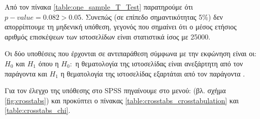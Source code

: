 \documentclass{assignment}
\begin{document}
\begin{Assignment}[Μέρος Β]
Από τον πίνακα \ref{table:one_sample_T_Test} παρατηρούμε ότι $p-value= 0.082 > 0.05$. Συνεπώς (σε επίπεδο σημαντικότητας 5\%) δεν απορρίπτουμε τη μηδενική υπόθεση, γεγονός που σημαίνει ότι ο μέσος ετήσιος αριθμός επισκέψεων των ιστοσελίδων είναι στατιστικά ίσος με 25000.



Οι δύο υποθέσεις που έρχονται σε αντιπαράθεση σύμφωνα με την εκφώνηση είναι οι: $H_0$ και $H_1$ όπου η $Η_0:$ η θεματολογία της ιστοσελίδας είναι ανεξάρτητη από τον παράγοντα  και $H_1$ η θεματολογία της ιστοσελίδας εξαρτάται από τον παράγοντα .

Για τον έλεγχο της υπόθεσης στο SPSS πηγαίνουμε στο μενού:  (βλ. σχήμα \ref{fig:crosstabs}) και προκύπτει ο πίνακας \ref{table:crosstabs_crosstabulation} και \ref{table:crosstabs_chi}. 


\end{Assignment}
\end{document}
